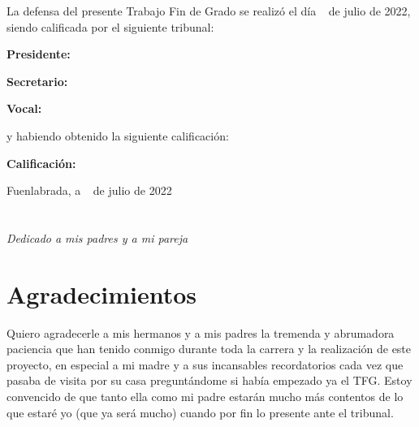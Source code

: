 \documentclass[a4paper, 12pt]{book}
\begin{document}
\vspace{1cm}
La defensa del presente Trabajo Fin de Grado se realizó el día \qquad$\;\,$ de julio de 2022, siendo calificada por el siguiente tribunal:


\vspace{0.5cm}
\textbf{Presidente:}

\vspace{1.2cm}
\textbf{Secretario:}

\vspace{1.2cm}
\textbf{Vocal:}


\vspace{1.2cm}
y habiendo obtenido la siguiente calificación:

\vspace{1cm}
\textbf{Calificación:}


\vspace{1cm}
\begin{flushright}
Fuenlabrada, a \qquad$\;\,$ de julio de 2022
\end{flushright}


\chapter*{}
\begin{flushright}
\textit{Dedicado a mis padres y a mi pareja}
\end{flushright}


\chapter*{Agradecimientos}

Quiero agradecerle a mis hermanos y a mis padres la tremenda y abrumadora paciencia que han tenido conmigo durante toda la carrera y la realización de este proyecto, en especial a mi madre y a sus incansables recordatorios cada vez que pasaba de visita por su casa preguntándome si había empezado ya el TFG. Estoy convencido de que tanto ella como mi padre estarán mucho más contentos de lo que estaré yo (que ya será mucho) cuando por fin lo presente ante el tribunal.
\end{document}
